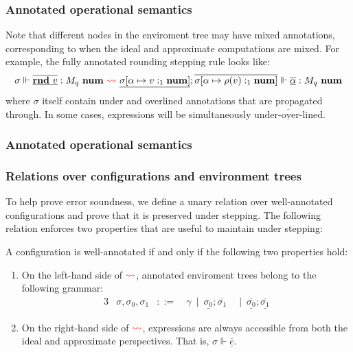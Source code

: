 \subsubsection{Annotated operational semantics}

Note that different nodes in the enviroment tree may have mixed annotations,
corresponding to when the ideal and approximate computations are mixed. For
example, the fully annotated rounding stepping rule looks like:
\begin{equation}\label{eq:rnd-annotated}
  \sigma \Vdash \underline{\overline{\mathbf{rnd} \ v}} : M_q \ \mathbf{num} \ \textcolor{red}{\rightsquigarrow} \
  \underline{\sigma [\alpha \mapsto v :_1 \mathbf{num}]}; \overline{\sigma [\alpha \mapsto \rho(v) :_1
  \mathbf{num}]} \Vdash \underline{\overline{\alpha}} : M_q \ \mathbf{num}
\end{equation}
where $\sigma$ itself contain under and overlined annotations that are
propagated through. In some cases, expressions will be simultaneously
$\underline{\overline{\text{under-over-lined}}}$. 

\subsubsection{Annotated operational semantics}

\subsubsection{Relations over configurations and environment trees}
To help prove error soundness, we define a unary relation over well-annotated
configurations and prove that it is preserved under stepping. The following
relation enforces two properties that are useful to maintain under stepping:
\begin{definition}
  A configuration is well-annotated if and only if the following two properties
  hold:
  \begin{enumerate}
    \item On the left-hand side of $\textcolor{red}{\rightsquigarrow}$, annotated
      enviroment trees belong to the following grammar:
      \begin{alignat*}{3}
            &\sigma, \sigma_0, \sigma_1 &::=~ & \gamma
            \ \mid \ \underline{\sigma_0}; \overline{\sigma_1}
            & \ \mid \ \overline{\underline{\sigma_0}}; \overline{\underline{\sigma_1}}
      \end{alignat*}
    \item On the right-hand side of $\textcolor{red}{\rightsquigarrow}$, 
      expressions are always accessible from both the ideal and approximate
      perspectives. That is, $\sigma \Vdash \underline{\overline{e}}$.
  \end{enumerate}
\end{definition}


